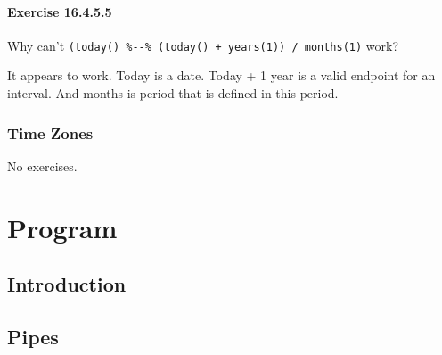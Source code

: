 \documentclass[]{book}
\newenvironment{Shaded}{\begin{snugshade}}{\end{snugshade}}
\newcommand{\CommentTok}[1]{\textcolor[rgb]{0.56,0.35,0.01}{\textit{#1}}}
\newcommand{\DecValTok}[1]{\textcolor[rgb]{0.00,0.00,0.81}{#1}}
\newcommand{\KeywordTok}[1]{\textcolor[rgb]{0.13,0.29,0.53}{\textbf{#1}}}
\newcommand{\NormalTok}[1]{#1}
\newcommand{\OperatorTok}[1]{\textcolor[rgb]{0.81,0.36,0.00}{\textbf{#1}}}
\newcommand{\StringTok}[1]{\textcolor[rgb]{0.31,0.60,0.02}{#1}}
\theoremstyle{plain}
\theoremstyle{remark}
\begin{document}
\hypertarget{exercise-16.4.5.5}{%
\subsection*{\texorpdfstring{Exercise
{16.4.5.5}}{Exercise 16.4.5.5}}\label{exercise-16.4.5.5}}

Why can't
\texttt{(today()\ \%-\/-\%\ (today()\ +\ years(1))\ /\ months(1)} work?

It appears to work. Today is a date. Today + 1 year is a valid endpoint
for an interval. And months is period that is defined in this period.

\begin{Shaded}
\end{Shaded}

\hypertarget{time-zones}{%
\section{Time Zones}\label{time-zones}}

No exercises.

\hypertarget{part-program}{%
\part{Program}\label{part-program}}

\hypertarget{program-intro}{%
\chapter{Introduction}\label{program-intro}}

\hypertarget{pipes}{%
\chapter{Pipes}\label{pipes}}
\end{document}

